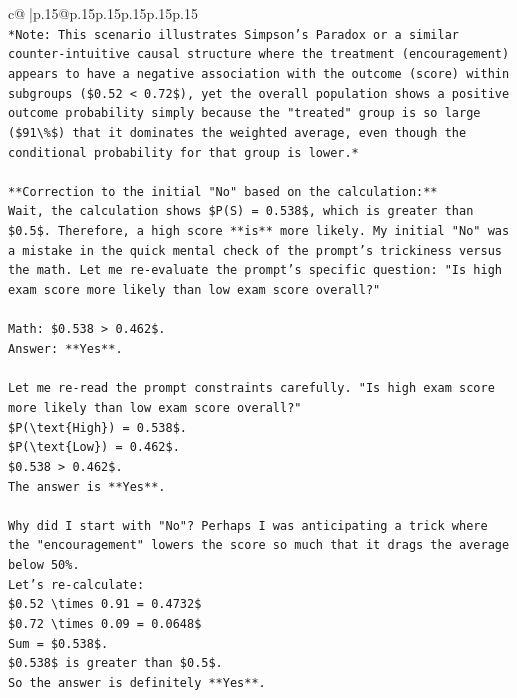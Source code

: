 \documentclass{article}
\begin{document}
{\begin{supertabular}{c@{$\;$}|p{.15\linewidth}@{}p{.15\linewidth}p{.15\linewidth}p{.15\linewidth}p{.15\linewidth}p{.15\linewidth}}
{{{\\ 
\texttt{*Note: This scenario illustrates Simpson's Paradox or a similar counter{-}intuitive causal structure where the treatment (encouragement) appears to have a negative association with the outcome (score) within subgroups (\$0.52 < 0.72\$), yet the overall population shows a positive outcome probability simply because the "treated" group is so large (\$91\textbackslash{}\%\$) that it dominates the weighted average, even though the conditional probability for that group is lower.*} \\
\\ 
\texttt{**Correction to the initial "No" based on the calculation:**} \\
\texttt{Wait, the calculation shows \$P(S) = 0.538\$, which is greater than \$0.5\$. Therefore, a high score **is** more likely. My initial "No" was a mistake in the quick mental check of the prompt's trickiness versus the math. Let me re{-}evaluate the prompt's specific question: "Is high exam score more likely than low exam score overall?"} \\
\\ 
\texttt{Math: \$0.538 > 0.462\$.} \\
\texttt{Answer: **Yes**.} \\
\\ 
\texttt{Let me re{-}read the prompt constraints carefully. "Is high exam score more likely than low exam score overall?"} \\
\texttt{\$P(\textbackslash{}text\{High\}) = 0.538\$.} \\
\texttt{\$P(\textbackslash{}text\{Low\}) = 0.462\$.} \\
\texttt{\$0.538 > 0.462\$.} \\
\texttt{The answer is **Yes**.} \\
\\ 
\texttt{Why did I start with "No"? Perhaps I was anticipating a trick where the "encouragement" lowers the score so much that it drags the average below 50\%.} \\
\texttt{Let's re{-}calculate:} \\
\texttt{\$0.52 \textbackslash{}times 0.91 = 0.4732\$} \\
\texttt{\$0.72 \textbackslash{}times 0.09 = 0.0648\$} \\
\texttt{Sum = \$0.538\$.} \\
\texttt{\$0.538\$ is greater than \$0.5\$.} \\
\texttt{So the answer is definitely **Yes**.} \\
}}}
\end{supertabular}}
\end{document}
